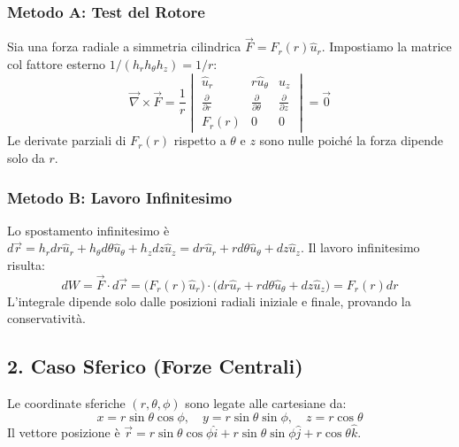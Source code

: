 \documentclass[11pt, a4paper]{article}
\begin{document}
\subsubsection*{Metodo A: Test del Rotore}
Sia una forza radiale a simmetria cilindrica $\vec{F} = F_r(r)\hat{u}_r$. Impostiamo la matrice col fattore esterno $1/(h_r h_\theta h_z) = 1/r$:
\begin{equation*}
    \vec{\nabla} \times \vec{F} = \frac{1}{r} 
    \begin{vmatrix} 
        \hat{u}_r & r\hat{u}_\theta & \hat{u}_z \\ 
        \frac{\partial}{\partial r} & \frac{\partial}{\partial \theta} & \frac{\partial}{\partial z} \\ 
        F_r(r) & 0 & 0 
    \end{vmatrix} = \vec{0}
\end{equation*}
Le derivate parziali di $F_r(r)$ rispetto a $\theta$ e $z$ sono nulle poich\'e la forza dipende solo da $r$.

\subsubsection*{Metodo B: Lavoro Infinitesimo}
Lo spostamento infinitesimo \`e $d\vec{r} = h_r dr\hat{u}_r + h_\theta d\theta\hat{u}_\theta + h_z dz\hat{u}_z = dr\hat{u}_r + rd\theta\hat{u}_\theta + dz\hat{u}_z$. Il lavoro infinitesimo risulta:
\begin{equation*}
    dW = \vec{F} \cdot d\vec{r} = \big(F_r(r)\hat{u}_r\big) \cdot \big(dr\hat{u}_r + rd\theta\hat{u}_\theta + dz\hat{u}_z\big) = F_r(r)dr
\end{equation*}
L'integrale dipende solo dalle posizioni radiali iniziale e finale, provando la conservativit\`a.

\newpage

\subsection*{2. Caso Sferico (Forze Centrali)}
Le coordinate sferiche $(r, \theta, \phi)$ sono legate alle cartesiane da:
\begin{equation*}
    x = r\sin\theta\cos\phi, \quad y = r\sin\theta\sin\phi, \quad z = r\cos\theta
\end{equation*}
Il vettore posizione \`e $\vec{r} = r\sin\theta\cos\phi\hat{i} + r\sin\theta\sin\phi\hat{j} + r\cos\theta\hat{k}$.
\end{document}
